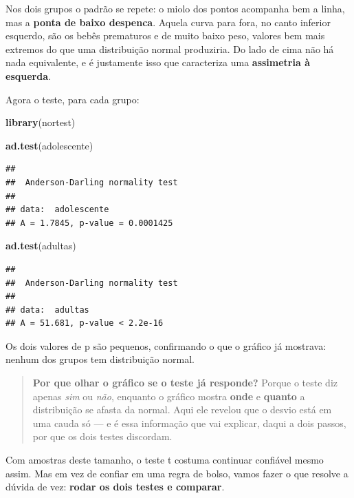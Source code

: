 \documentclass[
]{book}
\newenvironment{Shaded}{\begin{snugshade}}{\end{snugshade}}
\newcommand{\FunctionTok}[1]{\textcolor[rgb]{0.13,0.29,0.53}{\textbf{#1}}}
\newcommand{\NormalTok}[1]{#1}
\begin{document}
Nos dois grupos o padrão se repete: o miolo dos pontos acompanha bem a linha, mas a \textbf{ponta de baixo despenca}. Aquela curva para fora, no canto inferior esquerdo, são os bebês prematuros e de muito baixo peso, valores bem mais extremos do que uma distribuição normal produziria. Do lado de cima não há nada equivalente, e é justamente isso que caracteriza uma \textbf{assimetria à esquerda}.

Agora o teste, para cada grupo:

\begin{Shaded}
\begin{Highlighting}[]
\FunctionTok{library}\NormalTok{(nortest)}

\FunctionTok{ad.test}\NormalTok{(adolescente)}
\end{Highlighting}
\end{Shaded}

\begin{verbatim}
## 
##  Anderson-Darling normality test
## 
## data:  adolescente
## A = 1.7845, p-value = 0.0001425
\end{verbatim}

\begin{Shaded}
\begin{Highlighting}[]
\FunctionTok{ad.test}\NormalTok{(adultas)}
\end{Highlighting}
\end{Shaded}

\begin{verbatim}
## 
##  Anderson-Darling normality test
## 
## data:  adultas
## A = 51.681, p-value < 2.2e-16
\end{verbatim}

Os dois valores de p são pequenos, confirmando o que o gráfico já mostrava: nenhum dos grupos tem distribuição normal.

\begin{quote}
\textbf{Por que olhar o gráfico se o teste já responde?} Porque o teste diz apenas \emph{sim} ou \emph{não}, enquanto o gráfico mostra \textbf{onde} e \textbf{quanto} a distribuição se afasta da normal. Aqui ele revelou que o desvio está em uma cauda só --- e é essa informação que vai explicar, daqui a dois passos, por que os dois testes discordam.
\end{quote}

Com amostras deste tamanho, o teste t costuma continuar confiável mesmo assim. Mas em vez de confiar em uma regra de bolso, vamos fazer o que resolve a dúvida de vez: \textbf{rodar os dois testes e comparar}.
\end{document}
